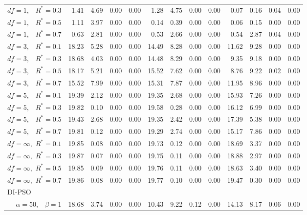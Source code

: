 \documentclass[12pt]{article}
\begin{document}
\begin{appendix}
\begin{table}[ht]
{\begin{tabular}{r|rrrr|rrrr|rrrr}
  $df = 1,\enspace$ $R^* =0.3$ & 1.41 & 4.69 & 0.00 & 0.00 & 1.28 & 4.75 & 0.00 & 0.00 & 0.07 & 0.16 & 0.04 & 0.00 \\ 
  $df = 1,\enspace$ $R^* =0.5$ & 1.11 & 3.97 & 0.00 & 0.00 & 0.14 & 0.39 & 0.00 & 0.00 & 0.06 & 0.15 & 0.00 & 0.00 \\ 
  $df = 1,\enspace$ $R^* =0.7$ & 0.63 & 2.81 & 0.00 & 0.00 & 0.53 & 2.66 & 0.00 & 0.00 & 0.54 & 2.87 & 0.04 & 0.00 \\ 
  $df = 3,\enspace$ $R^* =0.1$ & 18.23 & 5.28 & 0.00 & 0.00 & 14.49 & 8.28 & 0.00 & 0.00 & 11.62 & 9.28 & 0.00 & 0.00 \\ 
  $df = 3,\enspace$ $R^* =0.3$ & 18.68 & 4.03 & 0.00 & 0.00 & 14.48 & 8.29 & 0.00 & 0.00 & 9.35 & 9.18 & 0.00 & 0.00 \\ 
  $df = 3,\enspace$ $R^* =0.5$ & 18.17 & 5.21 & 0.00 & 0.00 & 15.52 & 7.62 & 0.00 & 0.00 & 8.76 & 9.22 & 0.02 & 0.00 \\ 
  $df = 3,\enspace$ $R^* =0.7$ & 15.52 & 7.99 & 0.00 & 0.00 & 15.31 & 7.87 & 0.00 & 0.00 & 11.95 & 8.96 & 0.00 & 0.00 \\ 
  $df = 5,\enspace$ $R^* =0.1$ & 19.39 & 2.12 & 0.00 & 0.00 & 19.35 & 2.68 & 0.00 & 0.00 & 15.93 & 7.26 & 0.00 & 0.00 \\ 
  $df = 5,\enspace$ $R^* =0.3$ & 19.82 & 0.10 & 0.00 & 0.00 & 19.58 & 0.28 & 0.00 & 0.00 & 16.12 & 6.99 & 0.00 & 0.00 \\ 
  $df = 5,\enspace$ $R^* =0.5$ & 19.43 & 2.68 & 0.00 & 0.00 & 19.35 & 2.42 & 0.00 & 0.00 & 17.39 & 5.38 & 0.00 & 0.00 \\ 
  $df = 5,\enspace$ $R^* =0.7$ & 19.81 & 0.12 & 0.00 & 0.00 & 19.29 & 2.74 & 0.00 & 0.00 & 15.17 & 7.86 & 0.00 & 0.00 \\ 
  $df = \infty,$ $R^* =0.1$ & 19.85 & 0.08 & 0.00 & 0.00 & 19.73 & 0.12 & 0.00 & 0.00 & 18.69 & 3.37 & 0.00 & 0.00 \\ 
  $df = \infty,$ $R^* =0.3$ & 19.87 & 0.07 & 0.00 & 0.00 & 19.75 & 0.11 & 0.00 & 0.00 & 18.88 & 2.97 & 0.00 & 0.00 \\ 
  $df = \infty,$ $R^* =0.5$ & 19.85 & 0.09 & 0.00 & 0.00 & 19.76 & 0.11 & 0.00 & 0.00 & 18.63 & 3.40 & 0.00 & 0.00 \\ 
  $df = \infty,$ $R^* =0.7$ & 19.86 & 0.08 & 0.00 & 0.00 & 19.77 & 0.10 & 0.00 & 0.00 & 19.47 & 0.30 & 0.00 & 0.00 \\ 
\hline
\multicolumn{1}{l|}{DI-PSO} &&&&&&&&&&&&\\
  $\alpha = 50,\enspace$ $\beta =1$ & 18.68 & 3.74 & 0.00 & 0.00 & 10.43 & 9.22 & 0.12 & 0.00 & 14.13 & 8.17 & 0.06 & 0.00 \\ 

\end{tabular}}
\end{table}
\end{appendix}
\end{document}
